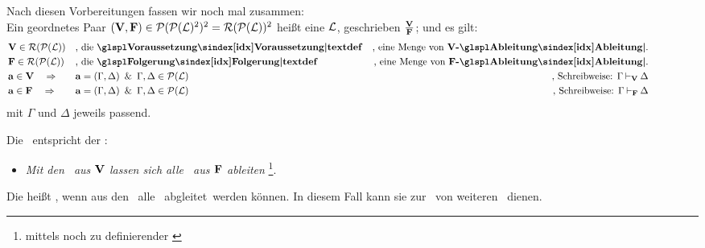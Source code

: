 Nach diesen Vorbereitungen fassen wir noch mal zusammen:\\
Ein geordnetes Paar $(\mathbf{V}, \mathbf{F}) \in \mathcal{P}(\mathcal{P}(\mathcal{L})^2)^2 = \mathcal{R}(\mathcal{P}(\mathcal{L}))^2$ heißt eine
  $\mathcal{L}$, geschrieben $\frac{\mathbf{V}}{\mathbf{F}}$; und es gilt:
\begin{align}
	& \prerequisiteSet \in \deriveSetRel
	&& \text{, die \definition{\Voraussetzungen}}
	& \text{, eine Menge von \defn{$\prerequisiteSet$-\Ableitungen}.}
	\label{def:ruleRelationVoraussetzungen}
	\\
	& \conclusionSet   \in \deriveSetRel
	&& \text{, die \definition{\Folgerungen}}
	& \text{, eine Menge von   \defn{$\conclusionSet$-\Ableitungen}.}
	\label{def:ruleRelationFolgerungen}
	\\
	& \abl{a} \in \prerequisiteSet \quad \metaimp
	&& \abl{a} = (\Gamma, \Delta) \; \metaand \; \Gamma, \Delta \in \formulaSetSet
	& \text{, Schreibweise: } \Gamma\derive_\prerequisiteSet \Delta
	\\
	& \abl{a} \in \conclusionSet \quad \metaimp
	&& \abl{a} = (\Gamma, \Delta) \; \metaand \; \Gamma, \Delta \in \formulaSetSet
	& \text{, Schreibweise: } \Gamma\derive_\conclusionSet \Delta
	\formulatoleft
\end{align}
mit $\Gamma$ und $\Delta$ jeweils passend.

Die \Schlussregel\ entspricht der \Aussage:
\begin{itemize}
	\item[] \emph{Mit den \Voraussetzungen\ aus $\mathbf{V}$ lassen sich alle \Folgerungen\ aus $\mathbf{F}$ ableiten}%
	\footnote{mittels noch zu definierender \emph{\zulaessigerTransformationen}}.
\end{itemize}
Die  heißt , wenn aus den \Voraussetzungen\ alle \Folgerungen\ abgleitet\ werden können.
In diesem Fall kann sie zur \zulaessigenTransformation\ von weiteren \Formeln\ dienen.

